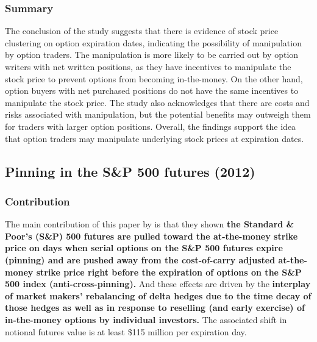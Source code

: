 \documentclass[10pt]{report}
\begin{document}
\subsubsection{Summary}

The conclusion of the study suggests that there is evidence of stock price clustering on option expiration dates, indicating the possibility of manipulation by option traders. The manipulation is more likely to be carried out by option writers with net written positions, as they have incentives to manipulate the stock price to prevent options from becoming in-the-money. On the other hand, option buyers with net purchased positions do not have the same incentives to manipulate the stock price. The study also acknowledges that there are costs and risks associated with manipulation, but the potential benefits may outweigh them for traders with larger option positions. Overall, the findings support the idea that option traders may manipulate underlying stock prices at expiration dates.




\clearpage
\subsection{Pinning in the S\&P 500 futures (2012)}

\subsubsection{Contribution}
The main contribution of this paper by \citet{Golez2012PinningIT} is that they shown \textbf{the Standard \& Poor’s (S\&P) 500 futures are pulled toward the at-the-money
strike price on days when serial options on the S\&P 500 futures expire (pinning) and are
pushed away from the cost-of-carry adjusted at-the-money strike price right before the
expiration of options on the S\&P 500 index (anti-cross-pinning).} And these effects are driven by
the \textbf{interplay of market makers’ rebalancing of delta hedges due to the time decay of those
hedges as well as in response to reselling (and early exercise) of in-the-money options by
individual investors.} The associated shift in notional futures value is at least \$115 million per
expiration day.
\end{document}
